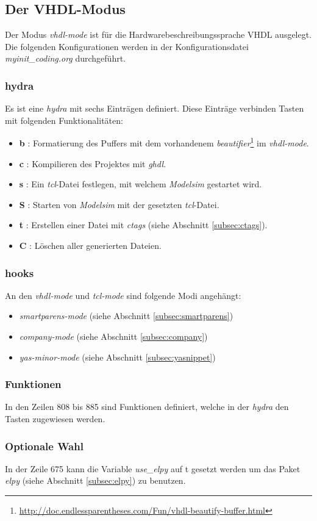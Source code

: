 \subsection{Der VHDL-Modus}
\label{subsec:vhdlmoduskonf}
Der Modus \textit{vhdl-mode} ist für die Hardwarebeschreibungssprache
VHDL ausgelegt. Die folgenden Konfigurationen werden in der
Konfigurationsdatei \textit{myinit\_coding.org} durchgeführt.\\

\subsubsection{hydra}
Es ist eine \textit{hydra} mit sechs Einträgen definiert. Diese
Einträge verbinden Tasten mit folgenden Funktionalitäten:
\begin{itemize}
\item \textbf{b} : Formatierung des Puffers mit dem vorhandenem
  \textit{beautifier}\footnote{\url{http://doc.endlessparentheses.com/Fun/vhdl-beautify-buffer.html}}
  im \textit{vhdl-mode}.
\item \textbf{c} : Kompilieren des Projektes mit \textit{ghdl}.
\item \textbf{s} : Ein \textit{tcl}-Datei festlegen, mit welchem
  \textit{Modelsim} gestartet wird.
\item \textbf{S} : Starten von \textit{Modelsim} mit der gesetzten
  \textit{tcl}-Datei.
\item \textbf{t} : Erstellen einer Datei mit \textit{ctags} (siehe
  Abschnitt \ref{subsec:ctags}).
\item \textbf{C} : Löschen aller generierten Dateien.
\end{itemize}

\subsubsection{hooks}
An den \textit{vhdl-mode} und \textit{tcl-mode} sind folgende Modi angehängt:
\begin{itemize}
\item \textit{smartparens-mode} (siehe Abschnitt
  \ref{subsec:smartparens})
\item \textit{company-mode} (siehe Abschnitt \ref{subsec:company})
\item \textit{yas-minor-mode} (siehe Abschnitt
  \ref{subsec:yasnippet})\\
\end{itemize}

\subsubsection{Funktionen}
In den Zeilen 808 bis 885 sind Funktionen definiert, welche in der
\textit{hydra} den Tasten zugewiesen werden.\\

\subsubsection{Optionale Wahl}
In der Zeile 675 kann die Variable \textit{use\_elpy} auf
{\glqq}t{\grqq} gesetzt werden um das Paket \textit{elpy} (siehe
Abschnitt \ref{subsec:elpy}) zu benutzen.

